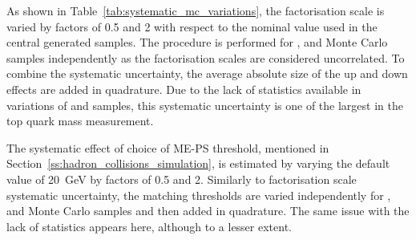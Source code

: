 \begin{description}[wide=\parindent]

\item [Factorisation scale.]
As shown in Table~\ref{tab:systematic_mc_variations}, the factorisation scale is varied by factors of 0.5 and 2 with
respect to the nominal value used in the central generated samples. The procedure is performed for \ttjets, \WpJets and
\ZpJets Monte Carlo samples independently as the factorisation scales are considered uncorrelated. To combine the
systematic uncertainty, the average absolute size of the up and down effects are added in quadrature. Due to the lack of
statistics available in variations of \WpJets and \ZpJets samples, this systematic uncertainty is one of the largest in
the top quark mass measurement.


\item [ME-PS matching threshold.]
The systematic effect of choice of ME-PS threshold, mentioned in Section~\ref{ss:hadron_collisions_simulation}, is
estimated by varying the default value of \SI{20}{\GeV} by factors of 0.5 and 2. Similarly to factorisation scale
systematic uncertainty, the matching thresholds are varied independently for \ttjets, \WpJets and \ZpJets Monte Carlo
samples and then added in quadrature. The same issue with the lack of statistics appears here, although to a lesser
extent.


\end{description}
